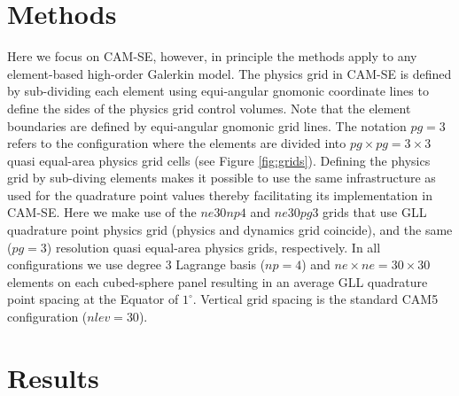 \documentclass[twocol]{ametsoc}
\begin{document}
\section{Methods}
Here we focus on CAM-SE, however, in principle the methods apply to any element-based high-order Galerkin model. The physics grid in CAM-SE is defined by sub-dividing each element using equi-angular gnomonic coordinate lines to define the sides of the physics grid control volumes. Note that the element boundaries are defined by equi-angular gnomonic grid lines. The notation $pg=3$ refers to the configuration where the elements are divided into $pg\times pg=3\times 3$ quasi equal-area physics grid cells (see Figure \ref{fig:grids}). Defining the physics grid by sub-diving elements makes it possible to use the same infrastructure as used for the quadrature point values thereby facilitating its implementation in CAM-SE. Here we make use of the $ne30np4$ and $ne30pg3$ grids that use GLL quadrature point physics grid (physics and dynamics grid coincide), and the same ($pg=3$) resolution quasi equal-area physics grids, respectively. In all configurations we use degree 3 Lagrange basis ($np=4$) and $ne\times ne=30\times 30$ elements on each cubed-sphere panel resulting in an average GLL quadrature point spacing at the Equator of $1^\circ$. Vertical grid spacing is the standard CAM5 configuration ($nlev=30$).

%

\section{Results}
\end{document}
